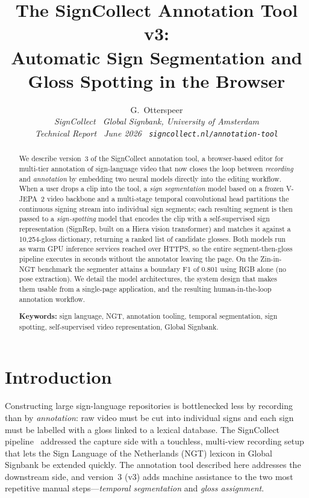 \documentclass[11pt]{article}
\title{\vspace{-1.2em}\bfseries The SignCollect Annotation Tool v3:\\[2pt]
Automatic Sign Segmentation and Gloss Spotting in the Browser}
\author{G.\ Otterspeer\\[2pt]
\normalsize\itshape SignCollect \textperiodcentered\ Global Signbank, University of Amsterdam\\[1pt]
\normalsize Technical Report \textperiodcentered\ June 2026 \textperiodcentered\
\texttt{signcollect.nl/annotation-tool}}
\date{}
\begin{document}
\maketitle

\begin{abstract}
\noindent We describe version~3 of the SignCollect annotation tool, a browser-based editor for
multi-tier annotation of sign-language video that now closes the loop between \emph{recording}
and \emph{annotation} by embedding two neural models directly into the editing workflow. When a
user drops a clip into the tool, a \emph{sign segmentation} model based on a frozen V-JEPA~2 video
backbone and a multi-stage temporal convolutional head partitions the continuous signing stream
into individual sign segments; each resulting segment is then passed to a \emph{sign-spotting}
model that encodes the clip with a self-supervised sign representation (SignRep, built on a Hiera
vision transformer) and matches it against a 10{,}254-gloss dictionary, returning a ranked list of
candidate glosses. Both models run as warm GPU inference services reached over HTTPS, so the entire
segment-then-gloss pipeline executes in seconds without the annotator leaving the page. On the
Zin-in-NGT benchmark the segmenter attains a boundary F1 of 0.801 using RGB alone (no pose
extraction). We detail the model architectures, the system design that makes them usable from a
single-page application, and the resulting human-in-the-loop annotation workflow.

\vspace{4pt}
\noindent\textbf{Keywords:} sign language, NGT, annotation tooling, temporal segmentation, sign
spotting, self-supervised video representation, Global Signbank.
\end{abstract}

\section{Introduction}
Constructing large sign-language repositories is bottlenecked less by recording than by
\emph{annotation}: raw video must be cut into individual signs and each sign must be labelled with a
gloss linked to a lexical database. The SignCollect pipeline~\citep{signcollect} addressed the
capture side with a touchless, multi-view recording setup that lets the Sign Language of the
Netherlands (NGT) lexicon in Global Signbank be extended quickly. The annotation tool described here
addresses the downstream side, and version~3 (v3) adds machine assistance to the two most repetitive
manual steps---\emph{temporal segmentation} and \emph{gloss assignment}.
\end{document}
